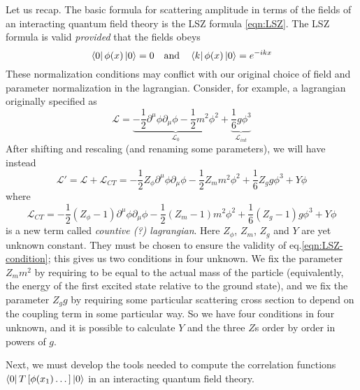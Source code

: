 \documentclass[../main/main.tex]{subfiles}
\begin{document}
Let us recap. The basic formula for scattering amplitude in terms of the fields of an interacting quantum field theory is the LSZ formula \eqref{eqn:LSZ}. The LSZ formula is valid \emph{provided} that the fields obeys
\begin{equation}\label{eqn:LSZ-condition}
\bra0\phi(x)\ket0=0\quad\text{and}\quad\bra k\phi(x)\ket0=e^{-ikx}
\end{equation}
These normalization conditions may conflict with our original choice of field and parameter normalization in the lagrangian. Consider, for example, a lagrangian originally specified as
\[\mathcal L=\underbrace{-\frac12\partial^\mu\phi\partial_\mu\phi-\frac12m^2\phi^2}_{\mathcal L_0}+\underbrace{\frac16g\phi^3}_{\mathcal L_{int}}\]
After shifting and rescaling (and renaming some parameters), we will have instead
\[\mathcal L'=\mathcal L+\mathcal L_{CT}=-\frac12Z_\phi\partial^\mu\phi\partial_\mu\phi-\frac12Z_mm^2\phi^2+\frac16Z_gg\phi^3+Y\phi\]
where
\[\mathcal L_{CT}=-\frac12(Z_\phi-1)\partial^\mu\phi\partial_\mu\phi-\frac12(Z_m-1)m^2\phi^2+\frac16(Z_g-1)g\phi^3+Y\phi\]
is a new term called \emph{countive (?) lagrangian}.
 Here $Z_\phi$, $Z_m$, $Z_g$ and $Y$ are yet unknown constant. They must be chosen to ensure the validity of eq.\eqref{eqn:LSZ-condition}; this gives us two conditions in four unknown. We fix the parameter $Z_mm^2$ by requiring  to be equal to the actual mass of the particle (equivalently, the energy of the first excited state relative to the ground state), and we fix the parameter $Z_gg$ by requiring some particular scattering cross section to depend on the coupling term in some particular way. So we have four conditions in four unknown, and it is possible to calculate $Y$ and the three $Z$s order by order in powers of $g$.

Next, we must develop the tools needed to compute the correlation functions $\bra0 T\left[\phi(x_1)\dots\right]\ket0$ in an interacting quantum field theory.
\end{document}
